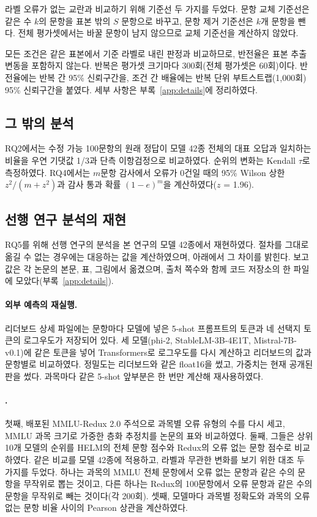 \documentclass[11pt]{article}
\begin{document}
라벨 오류가 없는 교란과 비교하기 위해 기준선 두 가지를 두었다. 문항 교체 기준선은 같은 수 $k$의 문항을 표본 밖의 $S$ 문항으로 바꾸고, 문항 제거 기준선은 $k$개 문항을 뺀다. 전체 평가셋에서는 바꿀 문항이 남지 않으므로 교체 기준선을 계산하지 않았다.

모든 조건은 같은 표본에서 기준 라벨로 내린 판정과 비교하므로, 반전율은 표본 추출 변동을 포함하지 않는다. 반복은 평가셋 크기마다 300회(전체 평가셋은 60회)이다. 반전율에는 반복 간 95\% 신뢰구간을, 조건 간 배율에는 반복 단위 부트스트랩(1,000회) 95\% 신뢰구간을 붙였다. 세부 사항은 부록~\ref{app:details}에 정리하였다.

\subsection{그 밖의 분석}
RQ2에서는 수정 가능 100문항의 원래 정답이 모델 42종 전체의 대표 오답과 일치하는 비율을 우연 기댓값 1/3과 단측 이항검정으로 비교하였다. 순위의 변화는 Kendall $\tau$\citep{kendall1938new}로 측정하였다. RQ4에서는 $m$문항 감사에서 오류가 0건일 때의 95\% Wilson 상한 $z^2/(m+z^2)$\citep{wilson1927probable}과 감사 통과 확률 $(1-e)^m$을 계산하였다($z$ = 1.96).

\subsection{선행 연구 분석의 재현}
\label{sec:method-compare}
RQ5를 위해 선행 연구의 분석을 본 연구의 모델 42종에서 재현하였다. 절차를 그대로 옮길 수 없는 경우에는 대응하는 값을 계산하였으며, 아래에서 그 차이를 밝힌다. 보고값은 각 논문의 본문, 표, 그림에서 옮겼으며, 출처 쪽수와 함께 코드 저장소의 한 파일에 모았다(부록~\ref{app:details}).

\paragraph{외부 예측의 재실행.} 리더보드 상세 파일에는 문항마다 모델에 넣은 5-shot 프롬프트의 토큰과 네 선택지 토큰의 로그우도가 저장되어 있다. 세 모델(phi-2, StableLM-3B-4E1T, Mistral-7B-v0.1)에 같은 토큰을 넣어 Transformers\citep{wolf2020transformers}로 로그우도를 다시 계산하고 리더보드의 값과 문항별로 비교하였다. 정밀도는 리더보드와 같은 float16을 썼고, 가중치는 현재 공개된 판을 썼다. 과목마다 같은 5-shot 앞부분은 한 번만 계산해 재사용하였다.

\paragraph{\citet{gema-etal-2025-done}.} 첫째, 배포된 MMLU-Redux 2.0 주석으로 과목별 오류 유형의 수를 다시 세고, MMLU 과목 크기로 가중한 층화 추정치를 논문의 표와 비교하였다. 둘째, 그들은 상위 10개 모델의 순위를 HELM의 전체 문항 점수와 Redux의 오류 없는 문항 점수로 비교하였다. 같은 비교를 모델 42종에 적용하고, 라벨과 무관한 변화를 보기 위한 대조 두 가지를 두었다. 하나는 과목의 MMLU 전체 문항에서 오류 없는 문항과 같은 수의 문항을 무작위로 뽑는 것이고, 다른 하나는 Redux의 100문항에서 오류 문항과 같은 수의 문항을 무작위로 빼는 것이다(각 200회). 셋째, 모델마다 과목별 정확도와 과목의 오류 없는 문항 비율 사이의 Pearson 상관을 계산하였다.
\end{document}
